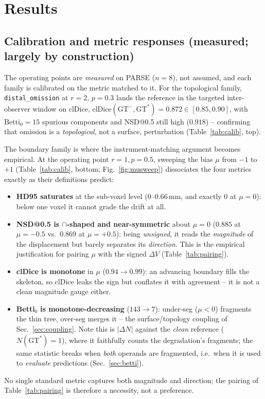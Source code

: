\documentclass[
    bookmarks, bookmarksnumbered, bookmarksopen,
    colorlinks=true, citecolor=blue, linkcolor=blue, urlcolor=blue
]{techrep}
\newcommand{\gtstar}{\ensuremath{\mathrm{GT}^{\!*}}}
\newcommand{\gtminus}{\ensuremath{\mathrm{GT}^{\!-}}}
\begin{document}
\chapter{Results}\label{sec:results}
\section{Calibration and metric responses (measured; largely by construction)}
The operating points are \emph{measured} on PARSE ($n{=}8$), not assumed, and each family is
calibrated on the metric matched to it. For the topological family,
\texttt{distal\_omission} at $r{=}2,\,p{=}0.3$ lands the reference in the targeted
inter-observer window on clDice, $\text{clDice}(\gtminus,\gtstar){=}0.872\in[0.85,0.90]$,
with $\text{Betti}_0{=}15$ spurious components and NSD@0.5 still high ($0.918$) --
confirming that omission is a \emph{topological}, not a surface, perturbation
(Table~\ref{tab:calib}, top).

The boundary family is where the instrument-matching argument becomes empirical. At the
operating point $r{=}1,p{=}0.5$, sweeping the bias $\mu$ from $-1$ to $+1$
(Table~\ref{tab:calib}, bottom; Fig.~\ref{fig:musweep}) dissociates the four metrics exactly as
their definitions predict:
\begin{itemize}[leftmargin=1.4em,itemsep=1pt]
  \item \textbf{HD95 saturates} at the sub-voxel level ($0$--$0.66$\,mm, and exactly $0$ at
  $\mu{=}0$): below one voxel it cannot grade the drift at all.
  \item \textbf{NSD@0.5 is $\cap$-shaped and near-symmetric} about $\mu{=}0$ ($0.885$ at
  $\mu{=}{-}0.5$ vs.\ $0.869$ at $\mu{=}{+}0.5$): being \emph{unsigned}, it reads the
  \emph{magnitude} of the displacement but barely separates its \emph{direction}. This is the
  empirical justification for pairing $\mu$ with the signed $\Delta V$
  (Table~\ref{tab:pairing}).
  \item \textbf{clDice is monotone} in $\mu$ ($0.94\!\to\!0.99$): an advancing boundary
  fills the skeleton, so clDice leaks the sign but conflates it with agreement -- it is
  not a clean magnitude gauge either.
  \item \textbf{Betti}$_0$ \textbf{is monotone-decreasing} ($143\!\to\!7$): under-seg
  ($\mu{<}0$) fragments the thin tree, over-seg merges it -- the surface/topology
  coupling of Sec.~\ref{sec:coupling}. Note this is $|\Delta N|$ against the \emph{clean}
  reference ($N(\gtstar){=}1$), where it faithfully counts the degradation's fragments; the same
  statistic breaks when \emph{both} operands are fragmented, i.e.\ when it is used to
  \emph{evaluate} predictions (Sec.~\ref{sec:betti}).
\end{itemize}
No single standard metric captures both magnitude and direction; the pairing of
Table~\ref{tab:pairing} is therefore a necessity, not a preference.
\end{document}
